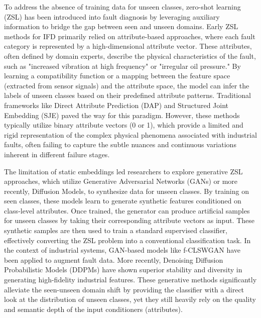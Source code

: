 To address the absence of training data for unseen classes, zero-shot learning (ZSL) has been introduced into fault diagnosis by leveraging auxiliary information to bridge the gap between seen and unseen domains. Early ZSL methods for IFD primarily relied on attribute-based approaches, where each fault category is represented by a high-dimensional attribute vector. These attributes, often defined by domain experts, describe the physical characteristics of the fault, such as "increased vibration at high frequency" or "irregular oil pressure." By learning a compatibility function or a mapping between the feature space (extracted from sensor signals) and the attribute space, the model can infer the labels of unseen classes based on their predefined attribute patterns. Traditional frameworks like Direct Attribute Prediction (DAP) and Structured Joint Embedding (SJE) paved the way for this paradigm. However, these methods typically utilize binary attribute vectors (0 or 1), which provide a limited and rigid representation of the complex physical phenomena associated with industrial faults, often failing to capture the subtle nuances and continuous variations inherent in different failure stages.

The limitation of static embeddings led researchers to explore generative ZSL approaches, which utilize Generative Adversarial Networks (GANs) or more recently, Diffusion Models, to synthesize data for unseen classes. By training on seen classes, these models learn to generate synthetic features conditioned on class-level attributes. Once trained, the generator can produce artificial samples for unseen classes by taking their corresponding attribute vectors as input. These synthetic samples are then used to train a standard supervised classifier, effectively converting the ZSL problem into a conventional classification task. In the context of industrial systems, GAN-based models like f-CLSWGAN have been applied to augment fault data. More recently, Denoising Diffusion Probabilistic Models (DDPMs) have shown superior stability and diversity in generating high-fidelity industrial features. These generative methods significantly alleviate the seen-unseen domain shift by providing the classifier with a direct look at the distribution of unseen classes, yet they still heavily rely on the quality and semantic depth of the input conditioners (attributes).

